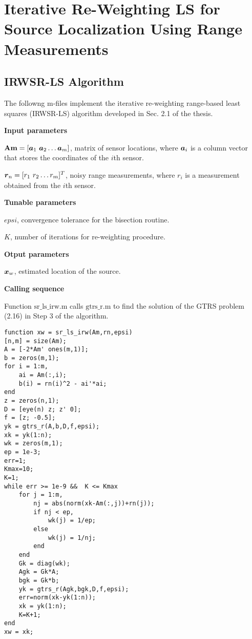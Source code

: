 \label{chapter:app2}


\section{Iterative Re-Weighting LS  for Source Localization Using Range Measurements}
\subsection{IRWSR-LS Algorithm}

The followng m-files implement the iterative re-weighting range-based least squares (IRWSR-LS) algorithm developed in Sec. 2.1 of the thesis. 

\phantom{m}

\noindent
\textbf{Input parameters}

\noindent
$\mbox{\textbf{Am}} = [\mbox{\boldmath$a$}_1 \ \mbox{\boldmath$a$}_2 \ldots \mbox{\boldmath$a$}_m]$, matrix of sensor locations, where $\mbox{\boldmath$a$}_i$ is a column vector that stores the coordinates of the $i$th sensor.

\noindent
$\mbox{\boldmath$r$}_n = [r_1 \ r_2 \ldots r_m]^T$, noisy range measurements, where $r_i$ is a measurement obtained from the $i$th sensor.

\noindent
\textbf{Tunable parameters}

\noindent
$epsi$, convergence tolerance for the bisection routine.

\noindent
$K$, number of iterations for re-weighting procedure.

\noindent
\textbf{Otput parameters}

\noindent
$\mbox{\boldmath$x$}_w$, estimated location of the source.

\noindent
\textbf{Calling sequence}

\noindent
Function $\mbox{sr\_ls\_irw.m}$ calls $\mbox{gtrs\_r.m}$ to find the solution of the GTRS problem (2.16) in Step 3 of the algorithm.

\phantom{m}

\begin{lstlisting}
function xw = sr_ls_irw(Am,rn,epsi)
[n,m] = size(Am);
A = [-2*Am' ones(m,1)];
b = zeros(m,1);
for i = 1:m,
    ai = Am(:,i);
    b(i) = rn(i)^2 - ai'*ai;
end
z = zeros(n,1);
D = [eye(n) z; z' 0];
f = [z; -0.5];
yk = gtrs_r(A,b,D,f,epsi);
xk = yk(1:n);
wk = zeros(m,1);
ep = 1e-3;
err=1;
Kmax=10; 
K=1;
while err >= 1e-9 &&  K <= Kmax 
    for j = 1:m,
        nj = abs(norm(xk-Am(:,j))+rn(j));
        if nj < ep,
            wk(j) = 1/ep;
        else
            wk(j) = 1/nj;
        end
    end
    Gk = diag(wk);
    Agk = Gk*A;
    bgk = Gk*b;
    yk = gtrs_r(Agk,bgk,D,f,epsi);
    err=norm(xk-yk(1:n));
    xk = yk(1:n);
    K=K+1;
end
xw = xk;
\end{lstlisting}

